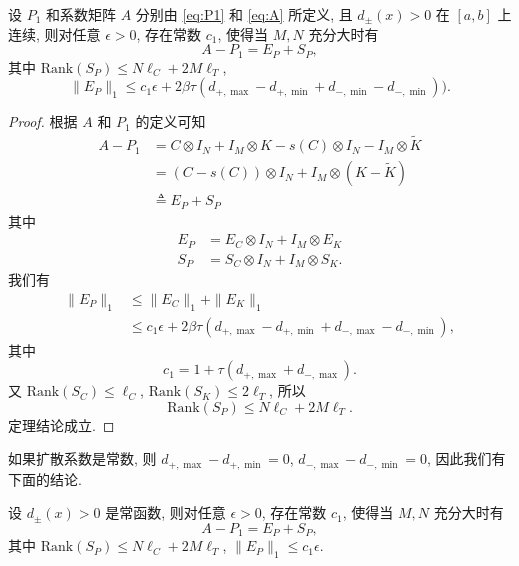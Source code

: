 \documentclass{ecnumaster}
\begin{document}
\begin{theorem}
  设 $P_1$ 和系数矩阵 $A$ 分别由 \eqref{eq:P1} 和 \eqref{eq:A} 所定义,
  且 $d_{\pm}(x)>0$ 在 $[a,b]$ 上连续, 
  则对任意 $\epsilon>0$, 存在常数 $c_1$, 使得当 $M,N$ 充分大时有
  $$ A - P_1 = E_P + S_P,$$
  其中 $\mathrm{Rank}(S_P)\leq N\ell_C + 2M\ell_T$,
  $$ \|E_P\|_1 \leq c_1 \epsilon + 2 \beta \tau (d_{+, \max} - d_{+, \min} + d_{-, \min} - d_{-, \min})).
  $$
\end{theorem}
\begin{proof}
  根据 $A$ 和 $P_1$ 的定义可知
  \begin{align*}
    A - P_1
    & = C \otimes I_N + I_M \otimes K - s(C) \otimes I_N - I_M \otimes \tilde{K}\\
    & = (C - s(C)) \otimes I_N + I_M \otimes (K - \tilde{K})\\
    & \triangleq E_P + S_P    
  \end{align*}
  其中 
  \begin{align*}
     E_P & = E_C \otimes I_N + I_M \otimes E_K \\
     S_P & = S_C \otimes I_N + I_M \otimes S_K.
   \end{align*}
   我们有
   \begin{align*}
     \|E_P\|_1 
     & \leq \| E_C \|_1 + \| E_K \|_1 \\
     & \leq c_1 \epsilon + 2 \beta \tau (d_{+, \max} - d_{+, \min} + d_{-, \max} - d_{-, \min}),
   \end{align*}   
   其中
   $$
     c_1  = 1 + \tau (d_{+, \max} + d_{-, \max}).
   $$
   又 $\mathrm{Rank}(S_C)\leq \ell_C$, $\mathrm{Rank}(S_K)\leq 2\ell_T$, 所以
   $$ \mathrm{Rank}(S_P)\leq N\ell_C + 2M\ell_T.$$
   定理结论成立.
\end{proof}

如果扩散系数是常数, 则 $d_{+,\max}-d_{+,\min}=0$, $d_{-,\max}-d_{-,\min}=0$,
因此我们有下面的结论.
\begin{corollary} 
  设 $d_{\pm}(x)>0$ 是常函数, 则对任意 $\epsilon>0$, 存在常数 $c_1$, 使得当 $M,N$ 充分大时有
  $$ A - P_1 = E_P + S_P,$$
  其中 $\mathrm{Rank}(S_P)\leq N\ell_C + 2M\ell_T$,
  $ \|E_P\|_1 \leq c_1 \epsilon. $
\end{corollary}
\end{document}

